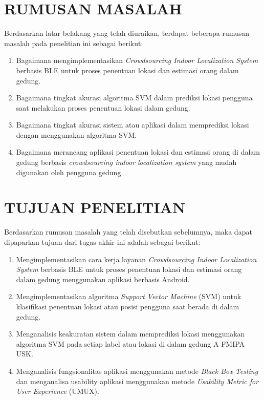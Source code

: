 \section{\uppercase{RUMUSAN MASALAH}}
Berdasarkan latar belakang yang telah diuraikan, terdapat beberapa rumusan masalah pada penelitian ini sebagai berikut:
\begin{enumerate}
	\item Bagaimana mengimplementasikan \textit{Crowdsourcing Indoor Localization System} berbasis BLE untuk proses penentuan lokasi dan estimasi orang dalam gedung.
	\item Bagaimana tingkat akurasi algoritma SVM dalam prediksi lokasi pengguna saat melakukan proses  penentuan lokasi dalam gedung.
	\item Bagaimana tingkat akurasi sistem atau aplikasi dalam memprediksi lokasi dengan menggunakan algoritma SVM.
	\item Bagaimana merancang aplikasi penentuan lokasi dan estimasi orang di dalam gedung berbasis \textit{crowdsourcing indoor localization system} yang mudah digunakan oleh pengguna gedung.

\end{enumerate}

\section{\uppercase{TUJUAN PENELITIAN}}
Berdasarkan rumusan masalah yang telah disebutkan sebelumnya, maka dapat dipaparkan tujuan dari tugas akhir ini adalah sebagai berikut:
\begin{enumerate}
	\item Mengimplementasikan cara kerja layanan \textit{Crowdsourcing Indoor Localization System} berbasis BLE untuk proses penentuan lokasi dan estimasi orang dalam gedung menggunakan aplikasi berbasis Android.
	\item Mengimplementasikan algoritma \textit{\textit{Support Vector Machine}} (SVM) untuk klasifikasi penentuan lokasi atau posisi pengguna saat berada  di dalam gedung.
	\item Menganalisis keakuratan sistem dalam memprediksi lokasi menggunakan algoritma SVM pada setiap label atau lokasi di dalam gedung A FMIPA USK.
	\item Menganalisis fungsionalitas aplikasi menggunakan metode \textit{Black Box Testing} dan menganalisa usability aplikasi menggunakan metode \textit{Usability Metric for User Experience} (UMUX).
\end{enumerate}


